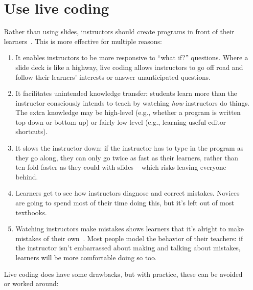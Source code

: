\documentclass[10pt,letterpaper]{article}
\newcommand{\rulemajor}[2]{\section{#1}\label{#2}}
\newcommand{\evidence}[1]{}
\begin{document}
\rulemajor{Use live coding}{live-coding}
\evidence{Low}

Rather than using slides,
instructors should create programs in front of their learners~\cite{rubin-live-coding}.
This is more effective for multiple reasons:

\begin{enumerate}

\item It enables instructors to be more responsive to ``what if?''
  questions. Where a slide deck is like a highway, live coding
  allows instructors to go off road and follow their learners'
  interests or answer unanticipated questions.

\item It facilitates unintended knowledge transfer: students learn
  more than the instructor consciously intends to teach by watching
  \textit{how} instructors do things.  The extra knowledge may be
  high-level (e.g., whether a program is written top-down or
  bottom-up) or fairly low-level (e.g., learning useful editor shortcuts).

\item It slows the instructor down: if the instructor has to type in
  the program as they go along, they can only go twice as fast as
  their learners, rather than ten-fold faster as they could with
  slides -- which risks leaving everyone behind.

\item Learners get to see how instructors diagnose and correct
  mistakes. Novices are going to spend most of their time doing
  this, but it's left out of most textbooks.

\item Watching instructors make mistakes shows learners that it's
  alright to make mistakes of their own~\cite{barker-live-coding}.
  Most people model the behavior of their teachers: if the instructor
  isn't embarrassed about making and talking about mistakes, learners
  will be more comfortable doing so too.

\end{enumerate}

Live coding does have some drawbacks, but with practice, these can be
avoided or worked around:
\end{document}
